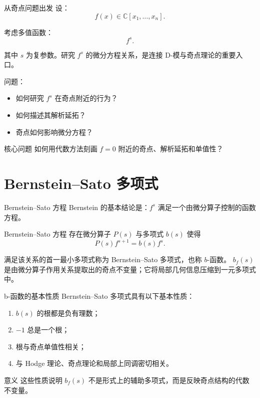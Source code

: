 \documentclass[aspectratio=169,11pt]{ctexbeamer}
\newcommand{\C}{\mathbb{C}}
\begin{document}
\begin{frame}{从奇点问题出发}
    设：
    \[
        f(x)\in\C[x_1,\dots,x_n].
    \]

    考虑多值函数：
    \[
        f^s.
    \]

    其中 $s$ 为复参数。研究 $f^s$ 的微分方程关系，是连接 D-模与奇点理论的重要入口。

    问题：

    \begin{itemize}
        \item 如何研究 $f^s$ 在奇点附近的行为？
        \item 如何描述其解析延拓？
        \item 奇点如何影响微分方程？
    \end{itemize}

    \begin{block}{核心问题}
        如何用代数方法刻画 $f=0$ 附近的奇点、解析延拓和单值性？
    \end{block}

\end{frame}



\section{Bernstein--Sato 多项式}

\begin{frame}{Bernstein--Sato 方程}
    Bernstein 的基本结论是：$f^s$ 满足一个由微分算子控制的函数方程。
    \pause
    \begin{block}{Bernstein--Sato 方程}
        存在微分算子 $P(s)$ 与多项式 $b(s)$ 使得
        \[
            P(s)f^{s+1}=b(s)f^s.
        \]
    \end{block}

    满足该关系的首一最小多项式称为 Bernstein--Sato 多项式，也称 $b$-函数。
    \pause
    $b_f(s)$ 是由微分算子作用关系提取出的奇点不变量；它将局部几何信息压缩到一元多项式中。


\end{frame}

\begin{frame}{b-函数的基本性质}
    Bernstein--Sato 多项式具有以下基本性质：

    \begin{enumerate}
        \item $b(s)$ 的根都是负有理数；
        \item $-1$ 总是一个根；
        \item 根与奇点单值性相关；
        \item 与 Hodge 理论、奇点理论和局部上同调密切相关。
    \end{enumerate}

    \begin{block}{意义}
        这些性质说明 $b_f(s)$ 不是形式上的辅助多项式，而是反映奇点结构的代数不变量。
    \end{block}

\end{frame}
\end{document}

